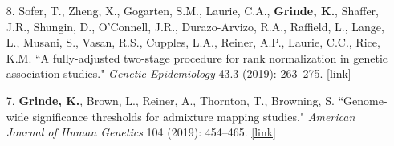 \documentclass[margin]{res}
\newcommand{\annotateItem}[1]{
	\begin{itemize} \vspace{-0.1cm}
	\item[] 
	\begin{footnotesize}\textcolor{black}{(#1)}\end{footnotesize}
	\end{itemize} \vspace{-0.1cm}
}
\begin{document}
\begin{resume}
\begin{itemize}
\item[8.] Sofer, T., Zheng, X., Gogarten, S.M., Laurie, C.A., \textbf{Grinde, K.}, Shaffer, J.R., Shungin, D., O'Connell, J.R., Durazo-Arvizo, R.A., Raffield, L., Lange, L., Musani, S., Vasan, R.S., Cupples, L.A., Reiner, A.P., Laurie, C.C., Rice, K.M. ``A fully-adjusted two-stage procedure for rank normalization in genetic association studies." \textit{Genetic Epidemiology} 43.3 (2019): 263--275.
\href{https://onlinelibrary.wiley.com/doi/abs/10.1002/gepi.22188}{[link]}

\item[7.] \textbf{Grinde, K.}, Brown, L., Reiner, A., Thornton, T., Browning, S. ``Genome-wide significance thresholds for admixture mapping studies." \textit{American Journal of Human Genetics} 104 (2019): 454--465. 
\href{https://www.cell.com/ajhg/pdf/S0002-9297(19)30008-4.pdf}{[link]}


\end{itemize}
\end{resume}
\end{document}
